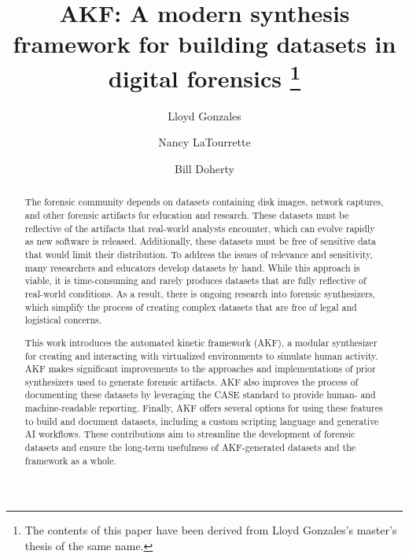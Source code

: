 \documentclass[final,5p,times,twocolumn]{elsarticle}
\begin{document}
\begin{frontmatter}

\title{AKF: A modern synthesis framework for building datasets in digital forensics
    \footnote{The contents of this paper have been derived from Lloyd Gonzales's master's thesis of the same name.}
}

\author[unr]{Lloyd Gonzales}
\author[unr]{Nancy LaTourrette}
\author[unr]{Bill Doherty}

\begin{abstract}
The forensic community depends on datasets containing disk images,
network captures, and other forensic artifacts for education and
research. These datasets must be reflective of the artifacts that
real-world analysts encounter, which can evolve rapidly as new software
is released. Additionally, these datasets must be free of sensitive data
that would limit their distribution. To address the issues of relevance
and sensitivity, many researchers and educators develop datasets by
hand. While this approach is viable, it is time-consuming and rarely
produces datasets that are fully reflective of real-world conditions. As
a result, there is ongoing research into forensic synthesizers, which
simplify the process of creating complex datasets that are free of legal
and logistical concerns.

This work introduces the automated kinetic framework (AKF), a modular
synthesizer for creating and interacting with virtualized environments
to simulate human activity. AKF makes significant improvements to the
approaches and implementations of prior synthesizers used to generate
forensic artifacts. AKF also improves the process of documenting these
datasets by leveraging the CASE standard to provide human- and
machine-readable reporting. Finally, AKF offers several options for
using these features to build and document datasets, including a custom
scripting language and generative AI workflows. These contributions aim
to streamline the development of forensic datasets and ensure the
long-term usefulness of AKF-generated datasets and the framework as a
whole.
\end{abstract}



\end{frontmatter}
\end{document}
